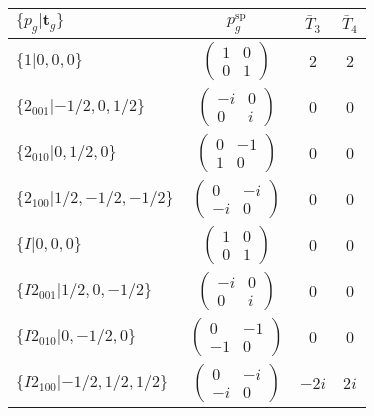 \documentclass[3p,preprint]{elsarticle}
\newcommand{\bt}{\bm{t}}
\begin{document}
\begin{table}[H]
	\begin{tabular}{|l|c||c|c|}\hline
			$\{p_g|\bt_g\}$ & $p_g^{\text{sp}}$ & $\bar{T}_3$ & $\bar{T}_4$  \\ \hline \hline
			$\{1|0,0,0\}$ & 					$\left(\begin{array}{cc} 1&0 \\ 0&1 \end{array}\right)$	& $2$ &  $2$ \\ \hline
			$\{2_{001}|-1/2,0,1/2\}$ &		$\left(\begin{array}{cc} -i&0 \\ 0&i \end{array}\right)$	& $0$ & $0$  \\ \hline
			$\{2_{010}|0,1/2,0\}$ &			$\left(\begin{array}{cc} 0&-1 \\ 1&0 \end{array}\right)$	& $0$ & $0$\\ \hline
			$\{2_{100}|1/2,-1/2,-1/2\}$ &		$\left(\begin{array}{cc} 0&-i \\ -i&0 \end{array}\right)$	& $0$ & $0$\\ \hline
			$\{I|0,0,0\}$ & 						$\left(\begin{array}{cc} 1&0 \\ 0&1 \end{array}\right)$	& $0$ &  $0$\\ \hline
			$\{I2_{001}|1/2,0,-1/2\}$ &		$\left(\begin{array}{cc} -i&0 \\ 0&i \end{array}\right)$	& $0$ & $0$  \\ \hline
			$\{I2_{010}|0,-1/2,0\}$ &			$\left(\begin{array}{cc} 0&-1 \\ -1&0 \end{array}\right)$	& $0$ & $0$\\ \hline
			$\{I2_{100}|-1/2,1/2,1/2\}$ &		$\left(\begin{array}{cc} 0&-i \\ -i&0 \end{array}\right)$	& $-2i$ & $2i$\\ \hline
	\end{tabular}
\end{table}
\end{document}
